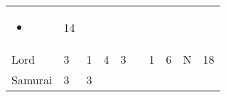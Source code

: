 \documentclass[12pt]{article}
\newcommand{\indexClass}[1]{\index{#1}}
\newcommand{\class}[1]{#1\indexClass{#1}}
\begin{document}
\begin{longtable}[]{@{}llllllllll@{}}
\begin{minipage}[t]{0.07\columnwidth}
\begin{itemize}
\item
\end{itemize}
\strut\end{minipage} &
\begin{minipage}[t]{0.08\columnwidth}\raggedright\strut
14
\strut\end{minipage}\tabularnewline
\begin{minipage}[t]{0.13\columnwidth}\raggedright\strut
\class{Lord}
\strut\end{minipage} &
\begin{minipage}[t]{0.06\columnwidth}\raggedright\strut
3
\strut\end{minipage} &
\begin{minipage}[t]{0.06\columnwidth}\raggedright\strut
1
\strut\end{minipage} &
\begin{minipage}[t]{0.06\columnwidth}\raggedright\strut
4
\strut\end{minipage} &
\begin{minipage}[t]{0.06\columnwidth}\raggedright\strut
3
\strut\end{minipage} &
\begin{minipage}[t]{0.06\columnwidth}\raggedright\strut
\strut\end{minipage} &
\begin{minipage}[t]{0.06\columnwidth}\raggedright\strut
1
\strut\end{minipage} &
\begin{minipage}[t]{0.06\columnwidth}\raggedright\strut
6
\strut\end{minipage} &
\begin{minipage}[t]{0.07\columnwidth}\raggedright\strut
N
\strut\end{minipage} &
\begin{minipage}[t]{0.08\columnwidth}\raggedright\strut
18
\strut\end{minipage}\tabularnewline
\begin{minipage}[t]{0.13\columnwidth}\raggedright\strut
\class{Samurai}
\strut\end{minipage} &
\begin{minipage}[t]{0.06\columnwidth}\raggedright\strut
3
\strut\end{minipage} &
\begin{minipage}[t]{0.06\columnwidth}\raggedright\strut
3
\strut\end{minipage} &
\begin{minipage}[t]{0.06\columnwidth}\raggedright\strut
\strut\end{minipage} &

\end{longtable}
\end{document}
